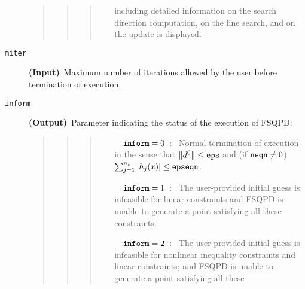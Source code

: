 \begin{description}
\begin{quote}
\begin{quote}
\begin{quote}
\begin{itemize}
                                including detailed information on the search 
                                direction computation, on the line search,
                                and on the update is displayed.
                  \end{itemize}
                  \end{quote}
                  \end{quote}
                  \end{quote}
\item[\tt miter] {\bf (Input)}~Maximum number of iterations
allowed by the user before termination of execution.
\item[\tt inform] {\bf (Output)}~Parameter indicating the status of
                   the execution of FSQPD:
                   \begin{quote}
                   \begin{quote}
                   \begin{quote}
                   \begin{itemize}
                  \item[~~${\tt inform} = 0$~:~] Normal termination of 
                               execution in the sense that 
                         $\|d^0\|\leq {\tt eps}$
                         and (if ${\tt neqn} \ne 0$) 
                         $\sum_{j=1}^{n_e}|h_j(x)|\leq {\tt epseqn}$.
                  \item[~~${\tt inform} = 1$~:~] The user-provided 
                                                 initial guess
                                                 is infeasible for
                                                 linear constraints and 
                                                 FSQPD is unable to 
                                                 generate a point
                                                 satisfying all these 
                                                 constraints.
                  \item[~~${\tt inform} = 2$~:~] The user-provided 
                                                 initial guess
                                                 is infeasible for nonlinear 
                                                 inequality constraints and
                                                 linear constraints; and 
                                                 FSQPD is unable to 
                                                 generate a point
                                                 satisfying all these

\end{itemize}
\end{quote}
\end{quote}
\end{quote}
\end{description}
